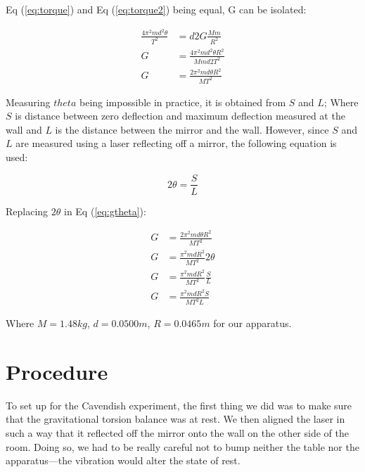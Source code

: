 \documentclass[12pt]{article}
\begin{document}
    Eq (\ref{eq:torque}) and Eq (\ref{eq:torque2}) being equal, G can be isolated:


    \begin{equation}
        \begin{aligned}
            \frac{4\pi^2md^2\theta}{T^2}&=d2G\frac{Mm}{R^2}\\
            G&=\frac{4\pi^2md^2\theta R^2}{Mmd2T^2}\\
            G&=\frac{2\pi^2md\theta R^2}{MT^2}\label{eq:gtheta}
        \end{aligned}
    \end{equation}

    Measuring $theta$ being impossible in practice, it is obtained from $S$ and $L$; Where $S$ is distance between zero deflection and maximum deflection measured at the wall and $L$ is the distance between the mirror and the wall. However, since $S$ and $L$ are measured using a laser reflecting off a mirror, the following equation is used:

    \begin{equation}
        2\theta = \frac{S}{L}
    \end{equation}

    Replacing $2\theta$ in Eq (\ref{eq:gtheta}):

    \begin{equation}
        \begin{aligned}
            G&=\frac{2\pi^2md\theta R^2}{MT^2}\\
            G&=\frac{\pi^2mdR^2}{MT^2} 2\theta\\
            G&=\frac{\pi^2mdR^2}{MT^2}  \frac{S}{L}\\
            G&=\frac{\pi^2mdR^2S}{MT^2L} \label{eq:final}
        \end{aligned}
    \end{equation}

    Where $M = 1.48kg$, $d = 0.0500m$, $R = 0.0465m$ for our apparatus.

\section*{Procedure}

To set up for the Cavendish experiment, the first thing we did was to make sure that the gravitational torsion balance was at rest. We then aligned the laser in such a way that it reflected off the mirror onto the wall on the other side of the room. Doing so, we had to be really careful not to bump neither the table nor the apparatus—the vibration would alter the state of rest.
\end{document}
